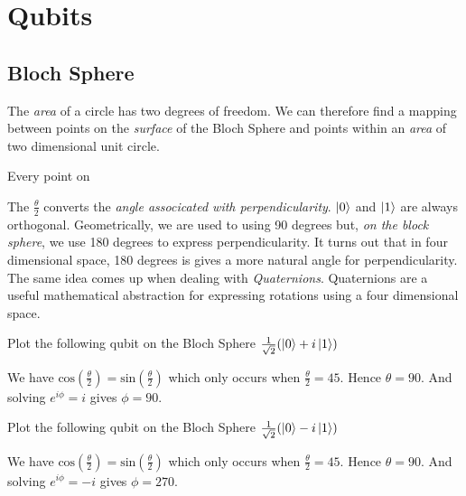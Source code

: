
\chapter{Qubits}



\section{Bloch Sphere}



The \textit{area} of a circle has two degrees of freedom. 
We can therefore find a mapping between points on the \textit{surface} of the Bloch Sphere and points 
within an \textit{area} of two dimensional unit circle. 

Every point on 





The $\frac{\theta}{2}$ converts the \textit{angle associcated with perpendicularity}. 
$\left|0\right\rangle$ and $\left|1\right\rangle$ are always orthogonal. Geometrically, we are used to using 90 degrees
but, \textit{on the block sphere}, we use 180 degrees to express perpendicularity. 
It turns out that in four dimensional space, 180 degrees is gives a more natural 
angle for perpendicularity. The same idea comes up when dealing with \textit{Quaternions}. 
Quaternions are a useful mathematical abstraction for expressing rotations 
using a four dimensional space.


\begin{example}
Plot the following qubit on the Bloch Sphere $\frac{1}{\sqrt{2}}(\left|0\right\rangle + i\left|1\right\rangle)$

We have  $\text{cos}(\frac{\theta}{2}) = \text{sin}(\frac{\theta}{2})$
which only occurs when $\frac{\theta}{2} = 45$. Hence $\theta = 90$.
And solving  $e^{i\phi} = i$ gives $\phi = 90$.
\end{example}

\begin{example}
Plot the following qubit on the Bloch Sphere $\frac{1}{\sqrt{2}}(\left|0\right\rangle - i\left|1\right\rangle)$

We have  $\text{cos}(\frac{\theta}{2}) = \text{sin}(\frac{\theta}{2})$
which only occurs when $\frac{\theta}{2} = 45$. Hence $\theta = 90$.
And solving  $e^{i\phi} = -i$ gives $\phi = 270$.
\end{example}

